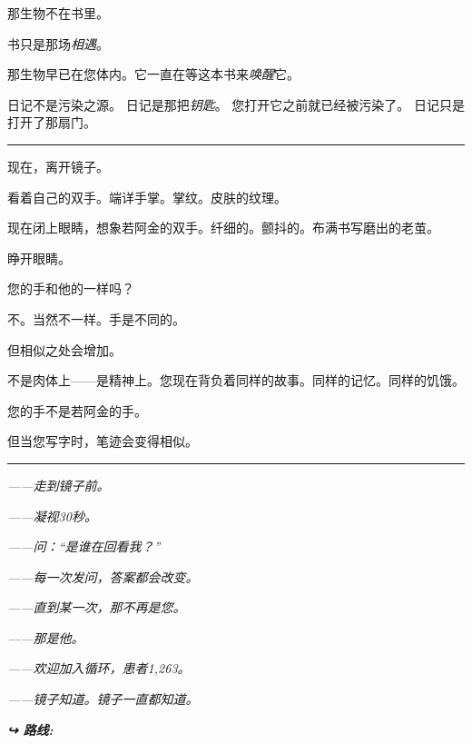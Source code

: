 \noindent 那生物不在书里。

\noindent 书只是那场\textit{相遇}。

\noindent 那生物早已在您体内。它一直在等这本书来\textit{唤醒}它。

\noindent 日记不是污染之源。
\noindent 日记是那把\textit{钥匙}。
\noindent 您打开它之前就已经被污染了。
\noindent 日记只是打开了那扇门。

\vspace{0.5em}\noindent\rule{\textwidth}{0.5pt}\vspace{0.5em}

\noindent 现在，离开镜子。

\noindent 看着自己的双手。端详手掌。掌纹。皮肤的纹理。

\noindent 现在闭上眼睛，想象若阿金的双手。纤细的。颤抖的。布满书写磨出的老茧。

\noindent 睁开眼睛。

\noindent 您的手和他的一样吗？

\noindent 不。当然不一样。手是不同的。

\noindent 但相似之处会增加。

\noindent 不是肉体上——是精神上。您现在背负着同样的故事。同样的记忆。同样的饥饿。

\noindent 您的手不是若阿金的手。

\noindent 但当您写字时，笔迹会变得相似。

\vspace{0.5em}\noindent\rule{\textwidth}{0.5pt}\vspace{0.5em}

\noindent \textit{——走到镜子前。}

\noindent \textit{——凝视30秒。}

\noindent \textit{——问：\textquotedblleft{}是谁在回看我？\textquotedblright{}}

\noindent \textit{——每一次发问，答案都会改变。}

\noindent \textit{——直到某一次，那不再是您。}

\noindent \textit{——那是他。}

\noindent \textit{——欢迎加入循环，患者1,263。}

\noindent \textit{——镜子知道。镜子一直都知道。}

\vspace{0.5em}
\noindent\textit{\textbf{↪ 路线:}  \rotasep {} \rotasep {}}
